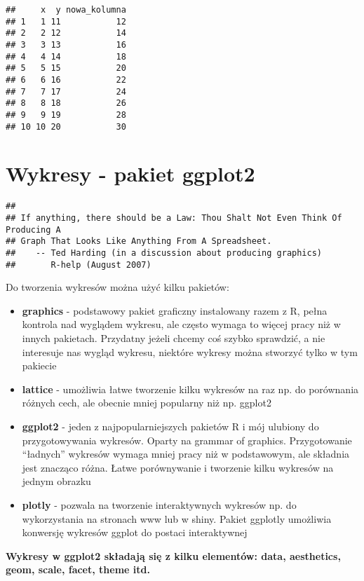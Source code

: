 \documentclass[
]{book}
\begin{document}
\begin{verbatim}
##     x  y nowa_kolumna
## 1   1 11           12
## 2   2 12           14
## 3   3 13           16
## 4   4 14           18
## 5   5 15           20
## 6   6 16           22
## 7   7 17           24
## 8   8 18           26
## 9   9 19           28
## 10 10 20           30
\end{verbatim}

\hypertarget{wykresy---pakiet-ggplot2}{%
\chapter{Wykresy - pakiet ggplot2}\label{wykresy---pakiet-ggplot2}}

\begin{verbatim}
## 
## If anything, there should be a Law: Thou Shalt Not Even Think Of Producing A
## Graph That Looks Like Anything From A Spreadsheet.
##    -- Ted Harding (in a discussion about producing graphics)
##       R-help (August 2007)
\end{verbatim}

Do tworzenia wykresów można użyć kilku pakietów:

\begin{itemize}
\item
  \textbf{graphics} - podstawowy pakiet graficzny instalowany razem z R, pełna kontrola nad wyglądem wykresu, ale często wymaga to więcej pracy niż w innych pakietach. Przydatny jeżeli chcemy coś szybko sprawdzić, a nie interesuje nas wygląd wykresu, niektóre wykresy można stworzyć tylko w tym pakiecie
\item
  \textbf{lattice} - umożliwia łatwe tworzenie kilku wykresów na raz np. do porównania różnych cech, ale obecnie mniej popularny niż np. ggplot2
\item
  \textbf{ggplot2} - jeden z najpopularniejszych pakietów R i mój ulubiony do przygotowywania wykresów. Oparty na grammar of graphics. Przygotowanie ``ładnych'' wykresów wymaga mniej pracy niż w podstawowym, ale składnia jest znacząco różna. Łatwe porównywanie i tworzenie kilku wykresów na jednym obrazku
\item
  \textbf{plotly} - pozwala na tworzenie interaktywnych wykresów np. do wykorzystania na stronach www lub w shiny. Pakiet ggplotly umożliwia konwersję wykresów ggplot do postaci interaktywnej
\end{itemize}

\textbf{Wykresy w ggplot2 składają się z kilku elementów: data, aesthetics, geom, scale, facet, theme itd.}
\end{document}
